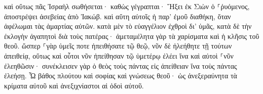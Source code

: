 \documentclass{openreader}
\begin{document}
καὶ οὕτως πᾶς Ἰσραὴλ σωθήσεται· καθὼς γέγραπται· Ἥξει ἐκ Σιὼν ὁ ⸀ῥυόμενος, ἀποστρέψει ἀσεβείας ἀπὸ Ἰακώβ. 
καὶ αὕτη αὐτοῖς ἡ παρ’ ἐμοῦ διαθήκη, ὅταν ἀφέλωμαι τὰς ἁμαρτίας αὐτῶν. 
κατὰ μὲν τὸ εὐαγγέλιον ἐχθροὶ δι’ ὑμᾶς, κατὰ δὲ τὴν ἐκλογὴν ἀγαπητοὶ διὰ τοὺς πατέρας· 
ἀμεταμέλητα γὰρ τὰ χαρίσματα καὶ ἡ κλῆσις τοῦ θεοῦ. 
ὥσπερ ⸀γὰρ ὑμεῖς ποτε ἠπειθήσατε τῷ θεῷ, νῦν δὲ ἠλεήθητε τῇ τούτων ἀπειθείᾳ, 
οὕτως καὶ οὗτοι νῦν ἠπείθησαν τῷ ὑμετέρῳ ἐλέει ἵνα καὶ αὐτοὶ ⸀νῦν ἐλεηθῶσιν· 
συνέκλεισεν γὰρ ὁ θεὸς τοὺς πάντας εἰς ἀπείθειαν ἵνα τοὺς πάντας ἐλεήσῃ. 
Ὦ βάθος πλούτου καὶ σοφίας καὶ γνώσεως θεοῦ· ὡς ἀνεξεραύνητα τὰ κρίματα αὐτοῦ καὶ ἀνεξιχνίαστοι αἱ ὁδοὶ αὐτοῦ. 
\end{document}
